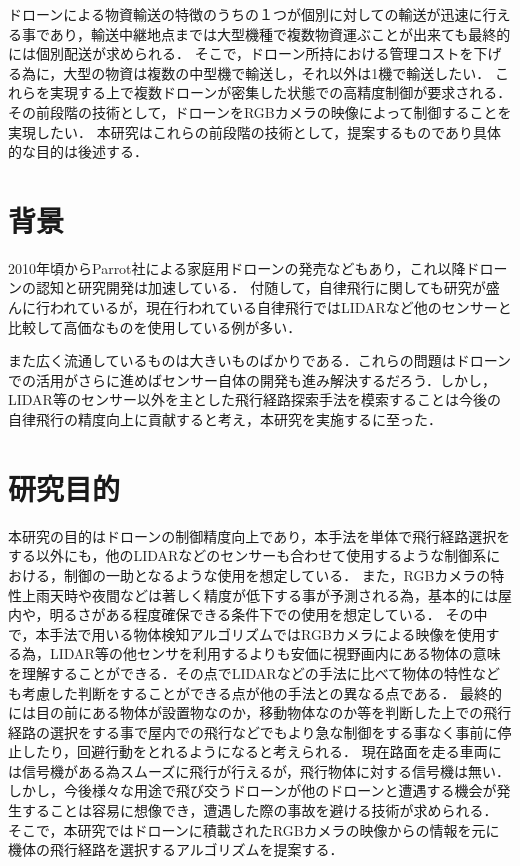 \documentclass[a4j,10pt]{jsarticle}
\begin{document}
ドローンによる物資輸送の特徴のうちの１つが個別に対しての輸送が迅速に行える事であり，輸送中継地点までは大型機種で複数物資運ぶことが出来ても最終的には個別配送が求められる．
そこで，ドローン所持における管理コストを下げる為に，大型の物資は複数の中型機で輸送し，それ以外は1機で輸送したい．
これらを実現する上で複数ドローンが密集した状態での高精度制御が要求される．その前段階の技術として，ドローンをRGBカメラの映像によって制御することを実現したい．
本研究はこれらの前段階の技術として，提案するものであり具体的な目的は後述する．

\section{背景}
2010年頃からParrot社による家庭用ドローンの発売などもあり，これ以降ドローンの認知と研究開発は加速している．
付随して，自律飛行に関しても研究が盛んに行われているが，現在行われている自律飛行ではLIDARなど他のセンサーと比較して高価なものを使用している例が多い．

また広く流通しているものは大きいものばかりである．これらの問題はドローンでの活用がさらに進めばセンサー自体の開発も進み解決するだろう．しかし，LIDAR等のセンサー以外を主とした飛行経路探索手法を模索することは今後の自律飛行の精度向上に貢献すると考え，本研究を実施するに至った．


\section{研究目的}
本研究の目的はドローンの制御精度向上であり，本手法を単体で飛行経路選択をする以外にも，他のLIDARなどのセンサーも合わせて使用するような制御系における，制御の一助となるような使用を想定している．
また，RGBカメラの特性上雨天時や夜間などは著しく精度が低下する事が予測される為，基本的には屋内や，明るさがある程度確保できる条件下での使用を想定している．
その中で，本手法で用いる物体検知アルゴリズムではRGBカメラによる映像を使用する為，LIDAR等の他センサを利用するよりも安価に視野画内にある物体の意味を理解することができる．その点でLIDARなどの手法に比べて物体の特性なども考慮した判断をすることができる点が他の手法との異なる点である．
最終的には目の前にある物体が設置物なのか，移動物体なのか等を判断した上での飛行経路の選択をする事で屋内での飛行などでもより急な制御をする事なく事前に停止したり，回避行動をとれるようになると考えられる．
現在路面を走る車両には信号機がある為スムーズに飛行が行えるが，飛行物体に対する信号機は無い．しかし，今後様々な用途で飛び交うドローンが他のドローンと遭遇する機会が発生することは容易に想像でき，遭遇した際の事故を避ける技術が求められる．
そこで，本研究ではドローンに積載されたRGBカメラの映像からの情報を元に機体の飛行経路を選択するアルゴリズムを提案する．
\end{document}
